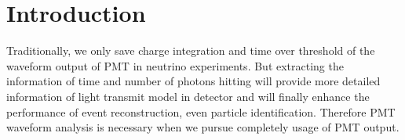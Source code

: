 \section{Introduction} %
\label{sec:Introduction}
Traditionally, we only save charge integration and time over threshold of the waveform output of PMT in neutrino experiments. But extracting the information of time and number of photons hitting will provide more detailed information of light transmit model in detector and will finally enhance the performance of event reconstruction, even particle identification. Therefore PMT waveform analysis is necessary when we pursue completely usage of PMT output. 
